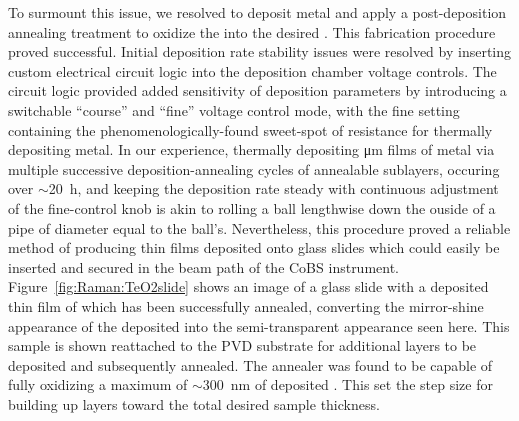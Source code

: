 To surmount this issue, we resolved to deposit  metal and apply a post-deposition annealing treatment to oxidize the  into the desired . This fabrication procedure proved successful. Initial deposition rate stability issues were resolved by inserting custom electrical circuit logic into the deposition chamber voltage controls. The circuit logic provided added sensitivity of deposition parameters by introducing a switchable ``course'' and ``fine'' voltage control mode, with the fine setting containing the phenomenologically-found sweet-spot of resistance for thermally depositing  metal. In our experience, thermally depositing \si{\micro\meter} films of  metal via multiple successive deposition-annealing cycles of annealable sublayers, occuring over \(\sim\)\SI{20}{\hour}, and keeping the deposition rate steady with continuous adjustment of the fine-control knob is akin to rolling a ball lengthwise down the ouside of a pipe of diameter equal to the ball's. Nevertheless, this procedure proved a reliable method of producing  thin films deposited onto glass slides which could easily be inserted and secured in the beam path of the \ac{CoBS} instrument. Figure~\ref{fig:Raman:TeO2slide} shows an image of a glass slide with a deposited thin film of  which has been successfully annealed, converting the mirror-shine appearance of the deposited  into the semi-transparent appearance seen here. This sample is shown reattached to the \ac{PVD} substrate for additional layers to be deposited and subsequently annealed. The annealer was found to be capable of fully oxidizing a maximum of \(\sim\)\SI{300}{\nano\meter} of deposited . This set the step size for building up  layers toward the total desired sample thickness.

